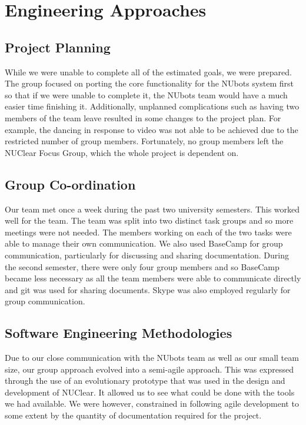 \documentclass[english,12pt]{scrartcl}
\begin{document}
\section{Engineering Approaches}
	\subsection{Project Planning}
		While we were unable to complete all of the estimated goals, we were prepared.
		The group focused on porting the core functionality for the NUbots system first so that if we were unable to complete it, the NUbots team would have a much easier time finishing it.
		Additionally, unplanned complications such as having two members of the team leave resulted in some changes to the project plan.
		For example, the dancing in response to video was not able to be achieved due to the restricted number of group members.
		Fortunately, no group members left the NUClear Focus Group, which the whole project is dependent on.

	\subsection{Group Co-ordination}
		Our team met once a week during the past two university semesters.
		This worked well for the team.
		The team was split into two distinct task groups and so more meetings were not needed.
		The members working on each of the two tasks were able to manage their own communication.
		We also used BaseCamp for group communication, particularly for discussing and sharing documentation.
		During the second semester, there were only four group members and so BaseCamp became less necessary as all the team members were able to communicate directly and git was used for sharing documents.
		Skype was also employed regularly for group communication.

	\subsection{Software Engineering Methodologies}
		Due to our close communication with the NUbots team as well as our small team size, our group approach evolved into a semi-agile approach.
		This was expressed through the use of an evolutionary prototype that was used in the design and development of NUClear.
		It allowed us to see what could be done with the tools we had available.
		We were however, constrained in following agile development to some extent by the quantity of documentation required for the project.
\end{document}

